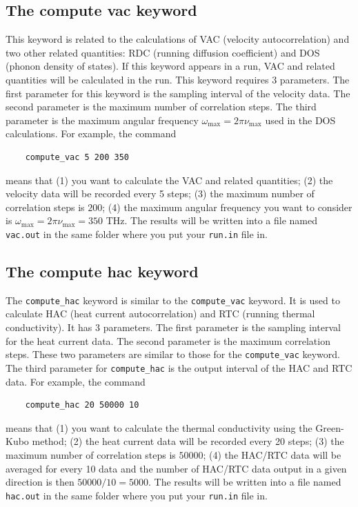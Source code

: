 \documentclass[12pt,a4paper]{report}
\begin{document}
\subsection{The compute vac keyword}

This keyword is related to the calculations of VAC (velocity autocorrelation) and two other related quantities: RDC (running diffusion coefficient) and DOS (phonon density of states).
If this keyword appears in a run, VAC and related quantities will be calculated in the run. This keyword requires 3 parameters.
The first parameter for this keyword is the sampling interval of the velocity data. The second parameter is the maximum number of correlation steps. The third parameter is the maximum angular frequency $\omega_{\text{max}}=2\pi \nu_{\text{max}}$ used in the DOS calculations. For example, the command
\begin{verbatim}
    compute_vac 5 200 350
\end{verbatim}
means that (1) you want to calculate the VAC and related quantities; (2) the velocity data will be recorded every 5 steps; (3) the maximum number of correlation steps is $200$; (4) the maximum angular frequency you want to consider is $\omega_{\text{max}}=2\pi \nu_{\text{max}}= 350$ THz. The results will be written into a file named \verb"vac.out" in the same folder where you put your \verb"run.in" file in.


\subsection{The compute hac keyword}

The \verb"compute_hac" keyword is similar to the \verb"compute_vac" keyword. It is used to calculate HAC (heat current autocorrelation) and RTC (running thermal conductivity).
It has 3 parameters. The first parameter is the sampling interval for the heat current data. The second parameter is the maximum correlation steps. These two parameters are similar to those for the \verb"compute_vac" keyword. The third parameter for \verb"compute_hac" is the output interval of the HAC and RTC data. For example, the command
\begin{verbatim}
    compute_hac 20 50000 10
\end{verbatim}
means that (1) you want to calculate the thermal conductivity using the Green-Kubo method; (2) the heat current data will be recorded every 20 steps; (3) the maximum number of correlation steps is $50000$; (4) the HAC/RTC data will be averaged for every 10 data and the number of HAC/RTC data output in a given direction is then $50000/10=5000$. The results will be written into a file named \verb"hac.out" in the same folder where you put your \verb"run.in" file in.
\end{document}
